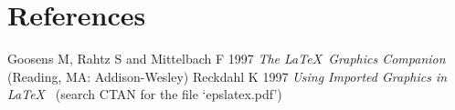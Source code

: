 \documentclass[12pt]{iopart}
\begin{document}
\section*{References}
\begin{thebibliography}{10}
 Goosens M, Rahtz S and Mittelbach F 1997 {\it The \LaTeX\ Graphics Companion\/} 
(Reading, MA: Addison-Wesley)
 Reckdahl K 1997 {\it Using Imported Graphics in \LaTeX\ } (search CTAN for the file `epslatex.pdf')
\end{thebibliography}
\end{document}
